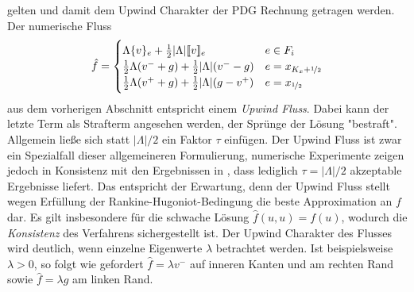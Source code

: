 gelten und damit dem Upwind Charakter der PDG Rechnung getragen werden. Der numerische Fluss
\begin{equation}
  \begin{aligned}
    \hat{f} = \begin{cases}
    \Lambda\{ v \}_e + \frac{1}{2}|\Lambda|\llbracket v \rrbracket_e & e\in F_i \\
    \frac{1}{2}\Lambda(v^- + g) + \frac{1}{2}|\Lambda|(v^- - g)   & e=x_{K_x+\nicefrac{1}{2}} \\
    \frac{1}{2}\Lambda(v^+ + g) + \frac{1}{2}|\Lambda|(g - v^+)   & e=x_{\nicefrac{1}{2}}
  \end{cases}
  \end{aligned}
\end{equation}
aus dem vorherigen Abschnitt entspricht einem \emph{Upwind Fluss}. Dabei kann der letzte Term als Strafterm angesehen werden, der Sprünge der Lösung "bestraft". Allgemein ließe sich statt $|\Lambda|/2$ ein Faktor $\tau$ einfügen. Der Upwind Fluss ist zwar ein Spezialfall dieser allgemeineren Formulierung, numerische Experimente zeigen jedoch in Konsistenz mit den Ergebnissen in \cite{feistauer2004}, dass lediglich $\tau=|\Lambda|/2$ akzeptable Ergebnisse liefert. Das entspricht der Erwartung, denn der Upwind Fluss stellt wegen Erfüllung der Rankine-Hugoniot-Bedingung die beste Approximation an $f$ dar. Es gilt insbesondere für die schwache Lösung $\hat{f}(u,u)=f(u)$, wodurch die \emph{Konsistenz} des Verfahrens sichergestellt ist. Der Upwind Charakter des Flusses wird deutlich, wenn einzelne Eigenwerte $\lambda$ betrachtet werden. Ist beispielsweise $\lambda>0$, so folgt wie gefordert $\hat{f}=\lambda v^-$ auf inneren Kanten und am rechten Rand sowie $\hat{f}=\lambda g$ am linken Rand.

